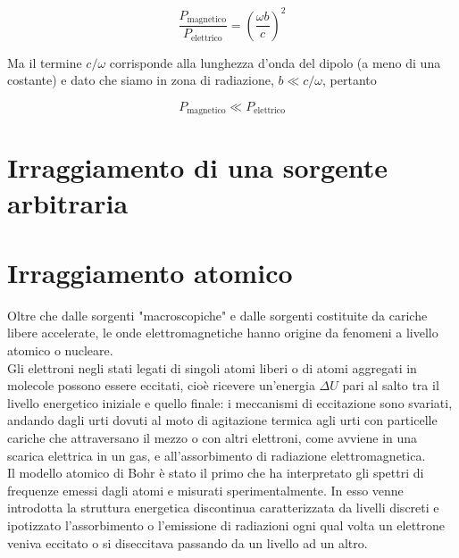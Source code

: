 \begin{tcolorbox}[colback=yellow!10!white, colframe=orange!70!black, boxrule=0.8pt]
\begin{equation}
    \frac{P_{\text{magnetico}}}{P_{\text{elettrico}}} = \left( \frac{\omega b}{c} \right)^2
\end{equation}
\end{tcolorbox}

Ma il termine $c/\omega$ corrisponde alla lunghezza d'onda del dipolo (a meno di una costante) e dato che siamo in zona di radiazione, $b \ll c/\omega$, pertanto 

\begin{tcolorbox}[colback=yellow!10!white, colframe=orange!70!black, boxrule=0.8pt]
\begin{equation}
    P_{\text{magnetico}} \ll P_{\text{elettrico}} 
\end{equation}
\end{tcolorbox}

\section{Irraggiamento di una sorgente arbitraria}

\newpage 

\section{Irraggiamento atomico}

Oltre che dalle sorgenti "macroscopiche" e dalle sorgenti costituite da cariche libere accelerate, le onde elettromagnetiche hanno origine da fenomeni a livello atomico o nucleare.\\

Gli elettroni negli stati legati di singoli atomi liberi o di atomi aggregati in molecole possono essere eccitati, cioè ricevere un’energia $\Delta U$ pari al salto tra il livello energetico iniziale e quello finale: i meccanismi di eccitazione sono svariati, andando dagli urti dovuti al moto di agitazione termica agli urti con particelle cariche che attraversano il mezzo o con altri elettroni, come avviene in una scarica elettrica in un gas, e all’assorbimento di radiazione elettromagnetica.\\

Il modello atomico di Bohr è stato il primo che ha interpretato gli spettri di frequenze emessi dagli atomi e misurati sperimentalmente. In esso venne introdotta la struttura energetica discontinua caratterizzata da livelli discreti e ipotizzato l’assorbimento o l’emissione di radiazioni ogni qual volta un elettrone veniva eccitato o si diseccitava passando da un livello ad un altro. 

